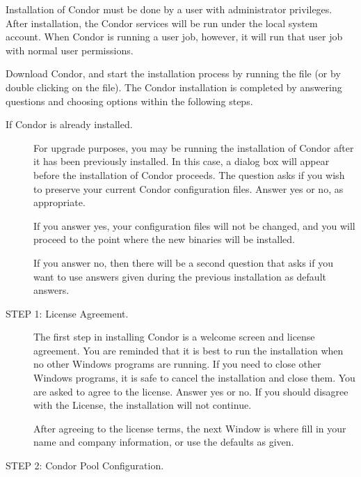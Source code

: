 % 

Installation of Condor must be done by a user with administrator privileges.
After installation, the Condor services will be run under the local system account.
When Condor is running a user job, however, 
it will run that user job with normal user permissions.

Download Condor, and start the installation process by running the file 
(or by double clicking on the file).
The Condor installation is completed by answering questions 
and choosing options within the following steps.


\begin{description}
\item[If Condor is already installed.]

     For upgrade purposes, you may be running the installation of Condor
     after it has been previously installed.
     In this case, a dialog box will appear before the
     installation of Condor proceeds.
     The question asks if you wish to preserve your current
     Condor configuration files.
     Answer yes or no, as appropriate.
	 
	 If you answer yes, your configuration files will not be changed, and you will proceed to the point where the new binaries will be installed.

     If you answer no, then there will be a second question
     that asks if you want to use answers
     given during the previous installation
     as default answers.

\item[STEP 1: License Agreement.]

     The first step in installing Condor
     is a welcome screen and license agreement.
     You are reminded that it is best to run the installation
     when no other Windows programs are running.
	 If you need to close other Windows programs, it is safe to cancel the
	 installation and close them.
     You are asked to agree to the license.
     Answer yes or no.  If you should disagree with the License, the
	 installation will not continue.

     After agreeing to the license terms, the next Window is where 
     fill in your name and company information,
     or use the defaults as given.

\item[STEP 2: Condor Pool Configuration.]


\end{description}
